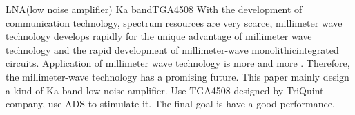 
\begin{Eabstract}{LNA(low noise amplifier) }{Ka band}{TGA4508}{}{}
With the development of communication technology, spectrum resources are very scarce, millimeter wave technology develops rapidly for the unique advantage of millimeter wave technology and the rapid development of millimeter-wave monolithicintegrated circuits. Application of millimeter wave technology is more and more . Therefore, the millimeter-wave technology has a promising future. This paper mainly design a kind of Ka band low noise amplifier. Use TGA4508 designed by TriQuint company, use ADS to stimulate it. The final goal is have a good performance.
\end{Eabstract}
